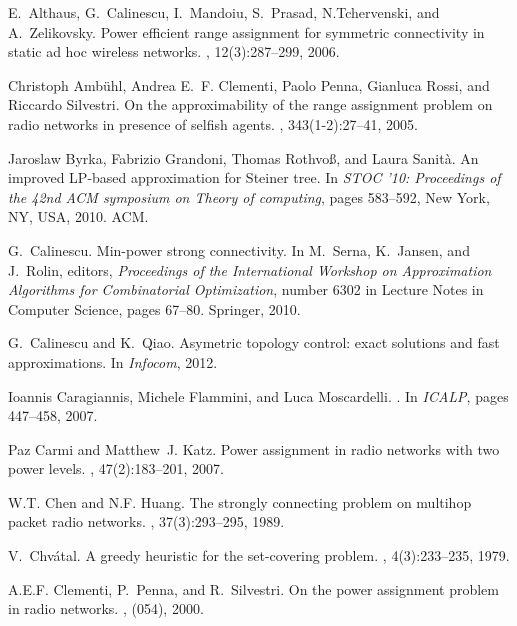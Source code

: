 \documentclass[12pt]{article}
\begin{document}
\begin{thebibliography}{10}

E.~Althaus, G.~Calinescu, I.~Mandoiu, S.~Prasad, N.Tchervenski, and
  A.~Zelikovsky.
\newblock Power efficient range assignment for symmetric connectivity in static
  ad hoc wireless networks.
, 12(3):287--299, 2006.

Christoph Amb\"{u}hl, Andrea E.~F. Clementi, Paolo Penna, Gianluca Rossi, and
  Riccardo Silvestri.
\newblock On the approximability of the range assignment problem on radio
  networks in presence of selfish agents.
, 343(1-2):27--41, 2005.

Jaroslaw Byrka, Fabrizio Grandoni, Thomas Rothvo\ss, and Laura Sanit\`{a}.
\newblock An improved {LP}-based approximation for {Steiner} tree.
\newblock In {\em STOC '10: Proceedings of the 42nd ACM symposium on Theory of
  computing}, pages 583--592, New York, NY, USA, 2010. ACM.

G.~Calinescu.
\newblock Min-power strong connectivity.
\newblock In M.\ Serna, K.\ Jansen, and J.\ Rolin, editors, {\em Proceedings of
  the International Workshop on Approximation Algorithms for Combinatorial
  Optimization}, number 6302 in Lecture Notes in Computer Science, pages
  67--80. Springer, 2010.

G.~Calinescu and K.~Qiao.
\newblock Asymetric topology control: exact solutions and fast approximations.
\newblock In {\em Infocom}, 2012.

Ioannis Caragiannis, Michele Flammini, and Luca Moscardelli.
.
\newblock In {\em ICALP}, pages 447--458, 2007.

Paz Carmi and Matthew~J. Katz.
\newblock Power assignment in radio networks with two power levels.
, 47(2):183--201, 2007.

W.T. Chen and N.F. Huang.
\newblock The strongly connecting problem on multihop packet radio networks.
, 37(3):293--295, 1989.

V.\ Chv\'atal.
\newblock A greedy heuristic for the set-covering problem.
, 4(3):233--235, 1979.

A.E.F. Clementi, P.~Penna, and R.~Silvestri.
\newblock On the power assignment problem in radio networks.
,
  (054), 2000.


\end{thebibliography}
\end{document}
